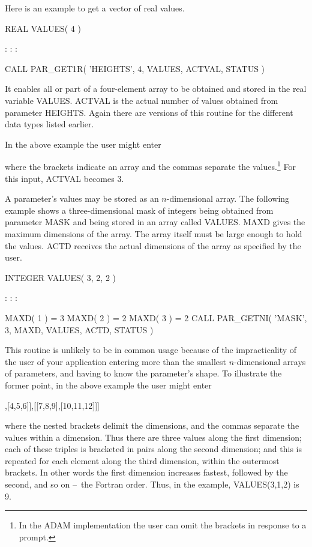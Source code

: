 \documentclass[twoside,11pt,nolof]{starlink}
\providecommand{\dash}{--}
\begin{document}
Here is an example to get a vector of real values.

\begin{terminalv}
      REAL VALUES( 4 )

          :       :       :

      CALL PAR_GET1R( 'HEIGHTS', 4, VALUES, ACTVAL, STATUS )
\end{terminalv}

It enables all or part of a four-element array to be obtained and
stored in the real variable VALUES.  ACTVAL is the actual number of
values obtained from parameter HEIGHTS.  Again there are versions of
this routine for the different data types listed earlier.

In the above example the user might enter

\begin{terminalv}
[1,2.5D0,3.456]
\end{terminalv}

where the brackets indicate an array and the commas
separate the values.\footnote{In the ADAM implementation the user can
omit the brackets in response to a prompt.}  For this input, ACTVAL
becomes 3.

A parameter's values may be stored as an $n$-dimensional array.
The following example shows a three-dimensional mask of integers
being obtained from parameter MASK and being stored in an array called
VALUES.  MAXD gives the maximum dimensions of the array.  The array
itself must be large enough to hold the values.  ACTD receives the
actual dimensions of the array as specified by the user.

\begin{terminalv}
      INTEGER VALUES( 3, 2, 2 )

          :       :       :

      MAXD( 1 ) = 3
      MAXD( 2 ) = 2
      MAXD( 3 ) = 2
      CALL PAR_GETNI( 'MASK', 3, MAXD, VALUES, ACTD, STATUS )
\end{terminalv}

This routine is unlikely to be in common usage because of the
impracticality of the user of your application entering more than the
smallest $n$-dimensional arrays of parameters, and having to know the
parameter's shape.  To illustrate the former point, in the above
example the user might enter
\begin{terminalv}
[[[1,2,3],[4,5,6]],[[7,8,9],[10,11,12]]]
\end{terminalv}

where the nested brackets delimit the dimensions, and the commas
separate the values within a dimension.  Thus there are three values
along the first dimension; each of these triples is bracketed in pairs
along the second dimension; and this is repeated for each element along
the third dimension, within the outermost brackets.  In other words the
first dimension increases fastest, followed by the second, and so
on \dash\ the Fortran order.  Thus, in the example, VALUES(3,1,2) is 9.
\end{document}

